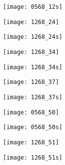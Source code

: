 \texttt{[image: 0568\_12s]}

\texttt{[image: 1268\_24]}

\texttt{[image: 1268\_24s]}

\texttt{[image: 1268\_34]}

\texttt{[image: 1268\_34s]}

\texttt{[image: 1268\_37]}

\texttt{[image: 1268\_37s]}

\texttt{[image: 0568\_50]}

\texttt{[image: 0568\_50s]}

\texttt{[image: 1268\_51]}

\texttt{[image: 1268\_51s]}

%

%
%
%
%
%

%



